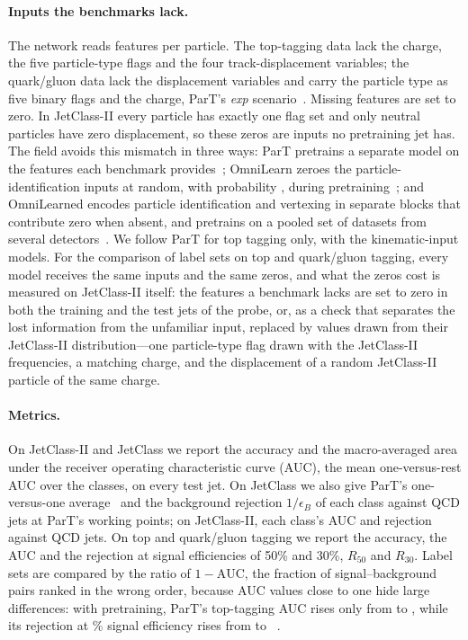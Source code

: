 \documentclass[11pt]{article}
\newcommand{\oma}{\ensuremath{1-\mathrm{AUC}}}
\begin{document}
\paragraph{Inputs the benchmarks lack.} The network reads \FillNFeatures{} features per particle.
The top-tagging data lack the charge, the five particle-type flags and the four track-displacement
variables; the quark/gluon data lack the displacement variables and carry the particle type as five
binary flags and the charge, ParT's \emph{exp} scenario~\cite[Table~2]{part}. Missing features are
set to zero. In JetClass-II every particle has exactly one flag set and only neutral particles have
zero displacement, so these zeros are inputs no pretraining jet has. The field avoids this mismatch
in three ways: ParT pretrains a separate model on the features each benchmark
provides~\cite[Sec.~5.2]{part}; OmniLearn zeroes the particle-identification inputs at random,
with probability \LitOmnilearnPidDropProb, during pretraining~\cite[Sec.~II.A]{omnilearn}; and
OmniLearned encodes particle identification and vertexing in separate blocks that contribute zero
when absent, and pretrains on a pooled set of datasets from several detectors~\cite{omnilearned}.
We follow ParT for top tagging only, with the kinematic-input models. For the comparison of label
sets on top and quark/gluon tagging, every model receives the same inputs and the same zeros, and
what the zeros cost is measured on JetClass-II itself: the features a benchmark lacks are set to
zero in both the training and the test jets of the probe, or, as a check that separates the lost
information from the unfamiliar input, replaced by values drawn from their JetClass-II
distribution---one particle-type flag drawn with the JetClass-II frequencies, a matching charge, and
the displacement of a random JetClass-II particle of the same charge.

\paragraph{Metrics.} On JetClass-II and JetClass we report the accuracy and the macro-averaged area
under the receiver operating characteristic curve (AUC), the mean one-versus-rest AUC over the
classes, on every test jet. On JetClass we also give ParT's one-versus-one average~\cite{part} and
the background rejection $1/\epsilon_B$ of each class against QCD jets at ParT's working points; on
JetClass-II, each class's AUC and rejection against QCD jets. On top and quark/gluon tagging we
report the accuracy, the AUC and the rejection at signal efficiencies of 50\% and 30\%, $R_{50}$ and
$R_{30}$. Label sets are compared by the ratio of $\oma$, the fraction of signal--background pairs
ranked in the wrong order, because AUC values close to one hide large differences: with
pretraining, ParT's top-tagging AUC rises only from \LitPartTopAucScratch{} to \LitPartTopAucFt,
while its rejection at \LitPartTopSigEffPercent\% signal efficiency rises from \LitPartTopRejScratch{}
to \LitPartTopRejFt~\cite[Table~5]{part}.
\end{document}
